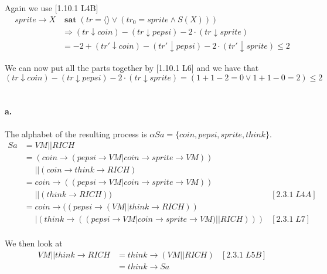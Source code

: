 \documentclass[a4paper, 11pt]{article}
\def\sat{\mathbf{\;sat\;}}
\begin{document}
Again we use [1.10.1 L4B]
\begin{align*}
sprite \rightarrow X &\sat (tr = \langle \rangle \vee (tr_0 = sprite \wedge S(X))) \\
& \Rightarrow (tr \downarrow coin) - (tr \downarrow pepsi) - 2 \cdot (tr \downarrow sprite) \\
& = -2 + (tr' \downarrow coin) - (tr' \downarrow pepsi) - 2 \cdot (tr' \downarrow sprite) \le 2
\end{align*}

We can now put all the parts together by [1.10.1 L6] and we have that
\[
    (tr \downarrow coin) - (tr \downarrow pepsi) - 2 \cdot (tr \downarrow sprite) = (1 + 1 - 2 = 0 \vee 1 + 1 - 0 = 2) \le 2
\]


\section{} %

\paragraph{a.} %
\label{par:a_}

The alphabet of the resulting process is $\alpha Sa = \{coin, pepsi, sprite, think\}$.
\begin{align*}
Sa &= VM || RICH \\
   &= (coin \rightarrow (pepsi \rightarrow VM | coin \rightarrow sprite \rightarrow VM)) \\
   &\phantom{=} || (coin \rightarrow think \rightarrow RICH) \\
   &= coin \rightarrow ((pepsi \rightarrow VM | coin \rightarrow sprite \rightarrow VM)) \\
   &\phantom{=} || (think \rightarrow RICH)) & [2.3.1\;L4A] \\
   &= coin \rightarrow ((pepsi \rightarrow (VM || think \rightarrow RICH)) \\
   &\phantom{=} | (think \rightarrow ((pepsi \rightarrow VM | coin \rightarrow sprite \rightarrow VM) || RICH))) & [2.3.1\;L7] \\
\end{align*}

We then look at
\begin{align*}
VM || think \rightarrow RICH &= think \rightarrow (VM || RICH) & [2.3.1\;L5B]\\
                             &=  think \rightarrow Sa
\end{align*}
\end{document}
